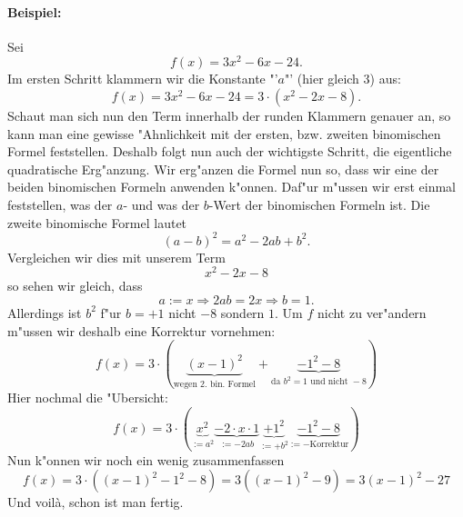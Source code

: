 \paragraph{Beispiel:}
Sei 
\begin{equation*}
f(x) = 3x^2 - 6x - 24.
\end{equation*}
Im ersten Schritt klammern wir die Konstante "'$a$"' (hier gleich $3$) aus:
\begin{equation*}
f(x) = 3x^2 - 6x - 24= 3 \cdot (x^2-2x-8).
\end{equation*}
Schaut man sich nun den Term innerhalb der runden Klammern genauer an, so kann man eine gewisse "Ahnlichkeit mit der ersten, bzw. zweiten binomischen Formel feststellen. Deshalb folgt nun auch der wichtigste Schritt, die eigentliche quadratische Erg"anzung. Wir erg"anzen die Formel nun so, dass wir eine der beiden binomischen Formeln anwenden k"onnen. Daf"ur m"ussen wir erst einmal feststellen, was der $a$- und was der $b$-Wert der binomischen Formeln ist. Die zweite binomische Formel lautet 
\begin{equation*}
(a-b)^2=a^2-2ab+b^2.
\end{equation*}
Vergleichen wir dies mit unserem Term 
\begin{equation*}
x^2-2x-8
\end{equation*}
so sehen wir gleich, dass
\begin{equation*}
a := x \Rightarrow 2ab = 2x \Rightarrow b = 1.
\end{equation*}
Allerdings ist $b^2$ f"ur $b = +1$ nicht $-8$ sondern $1$. Um $f$ nicht zu ver"andern m"ussen wir deshalb eine Korrektur vornehmen:
\begin{equation*}
f(x) = 3 \cdot \left(  \underbrace{(x-1)^2}_{\text{wegen 2. bin. Formel}} + \underbrace{-1^2 - 8}_{\text{da } b^2 = 1 \text{ und nicht } -8 } \right)
\end{equation*}
Hier nochmal die "Ubersicht:
\begin{equation*}
f(x) = 3 \cdot \left(  \underbrace{x^2}_{:=a^2} \underbrace{- 2 \cdot x \cdot 1}_{:= -2ab} \underbrace{+ 1^2}_{:= + b^2} \underbrace{- 1^2 -8}_{:=-\text{Korrektur}} \right)
\end{equation*} 
Nun k"onnen wir noch ein wenig zusammenfassen
\begin{equation*}
f(x) = 3 \cdot ((x-1)^2-1^2-8) = 3((x-1)^2-9) = 3(x-1)^2-27
\end{equation*}
Und voil\`a, schon ist man fertig.

